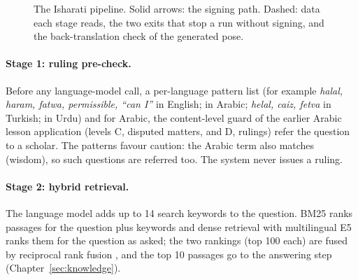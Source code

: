 \begin{figure}[ht]
{}
\caption{The Isharati pipeline. Solid arrows: the signing path. Dashed: data each stage reads, the two exits that
stop a run without signing, and the back-translation check of the generated pose.}
\label{fig:pipeline}
\end{figure}

\paragraph{Stage 1: ruling pre-check.} Before any language-model call, a per-language pattern list (for example
\emph{halal, haram, fatwa, permissible, ``can I''} in English;  in Arabic; \emph{helal, caiz, fetva}
in Turkish;  in Urdu) and for Arabic, the content-level guard of the earlier Arabic lesson application (levels C,
disputed matters, and D, rulings) refer the question to a scholar. The patterns favour caution: the Arabic
term  also matches  (wisdom), so such questions are referred too. The system never issues a ruling.

\paragraph{Stage 2: hybrid retrieval.} The language model adds up to 14 search keywords to the question. BM25
\cite{bm25} ranks passages for the question plus keywords and dense retrieval with multilingual E5 \cite{me5} ranks them for the
question as asked; the two rankings (top 100 each) are fused by reciprocal rank fusion \cite{rrf}, and the top 10
passages go to the answering step (Chapter~\ref{sec:knowledge}).

